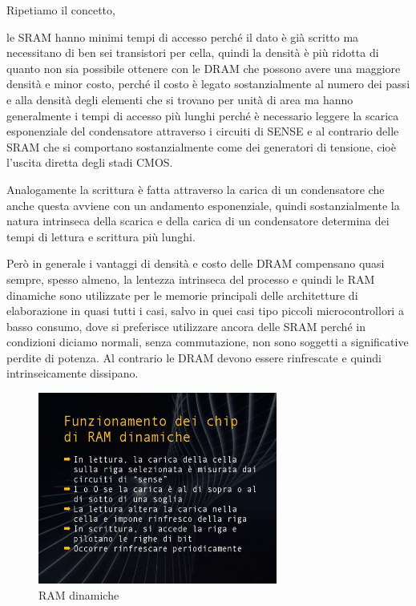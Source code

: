 Ripetiamo il concetto, 

le SRAM hanno minimi tempi di accesso perché il dato è già scritto ma necessitano di ben sei transistori per cella, quindi la densità è più ridotta di quanto non sia possibile ottenere con le DRAM che possono avere una maggiore densità e minor costo, perché il costo è legato sostanzialmente al numero dei passi e alla densità degli elementi che si trovano per unità di area ma hanno generalmente i tempi di accesso più lunghi perché è necessario leggere la scarica esponenziale del condensatore attraverso i circuiti di SENSE e al contrario delle SRAM che si comportano sostanzialmente come dei generatori di tensione, cioè l'uscita diretta degli stadi CMOS.

Analogamente la scrittura è fatta attraverso la carica di un condensatore che anche questa avviene con un andamento esponenziale, quindi sostanzialmente la natura intrinseca della scarica e della carica di un condensatore determina dei tempi di lettura e scrittura più lunghi.

Però in generale i vantaggi di densità e costo delle DRAM compensano quasi sempre, spesso almeno, la lentezza intrinseca del processo e quindi le RAM dinamiche sono utilizzate per le memorie principali delle architetture di elaborazione in quasi tutti i casi, salvo in quei casi tipo piccoli microcontrollori a basso consumo, dove si preferisce utilizzare ancora delle SRAM perché in condizioni diciamo normali, senza commutazione, non sono soggetti a significative perdite di potenza. Al contrario le DRAM devono essere rinfrescate e quindi intrinseicamente dissipano.
\FloatBarrier
\begin{figure}[H]
  \centering
  \includegraphics[width=0.70\textwidth,
                    trim=50 60 40 50, %
                    clip]
                    {images/Lez04_p04_fig_03.png}
  \caption{RAM dinamiche}
  \label{fig:Lez04_p04_fig_03}
\end{figure}
\FloatBarrier
\noindent

